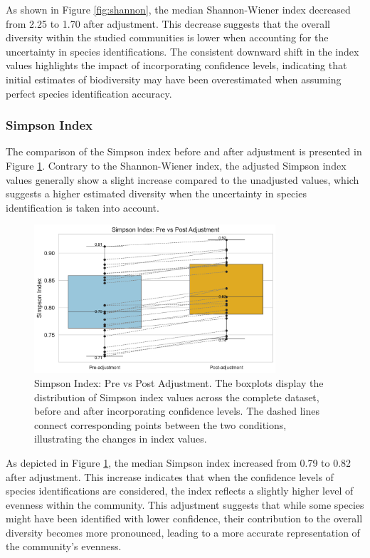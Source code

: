 \documentclass[a4paper,12pt]{article}
\begin{document}
As shown in Figure \ref{fig:shannon}, the median Shannon-Wiener index decreased from 2.25 to 1.70 after adjustment. This decrease suggests that the overall diversity within the studied communities is lower when accounting for the uncertainty in species identifications. The consistent downward shift in the index values highlights the impact of incorporating confidence levels, indicating that initial estimates of biodiversity may have been overestimated when assuming perfect species identification accuracy.


\subsubsection{Simpson Index}
The comparison of the Simpson index before and after adjustment is presented in Figure \ref{fig:simpson}. Contrary to the Shannon-Wiener index, the adjusted Simpson index values generally show a slight increase compared to the unadjusted values, which suggests a higher estimated diversity when the uncertainty in species identification is taken into account.

\begin{figure}[H]
\centering
\includegraphics[width=0.8\textwidth]{Figures/simpson.png}
\caption{Simpson Index: Pre vs Post Adjustment. The boxplots display the distribution of Simpson index values across the complete dataset, before and after incorporating confidence levels. The dashed lines connect corresponding points between the two conditions, illustrating the changes in index values.}
\label{fig:simpson}
\end{figure}

As depicted in Figure \ref{fig:simpson}, the median Simpson index increased from 0.79 to 0.82 after adjustment. This increase indicates that when the confidence levels of species identifications are considered, the index reflects a slightly higher level of evenness within the community. This adjustment suggests that while some species might have been identified with lower confidence, their contribution to the overall diversity becomes more pronounced, leading to a more accurate representation of the community's evenness.
\end{document}

